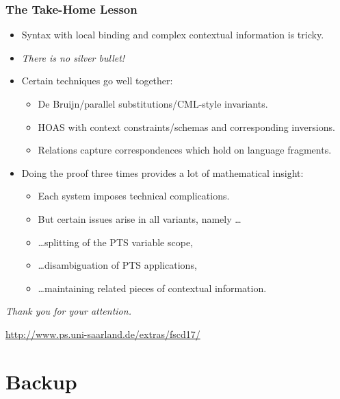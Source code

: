 \documentclass[english,pdftex,dvipsnames,leqno,handout]{beamer}%
\newcommand{\hl}[1]{\emph{\color{sbmcyan} #1}}
\begin{document}
\begin{frame}
  \frametitle{The Take-Home Lesson}
  \begin{itemize}
  \item Syntax with local binding and complex contextual information is tricky.
  \item \hl{There is no silver bullet!}
  \item Certain techniques go well together:
    \begin{itemize}
    \item De Bruijn/parallel substitutions/CML-style invariants.
    \item HOAS with context constraints/schemas and corresponding inversions.
    \item Relations capture correspondences which hold on language fragments.
    \end{itemize}
  \item Doing the proof three times provides a lot of mathematical insight:
    \begin{itemize}
    \item Each system imposes technical complications.
    \item But certain issues arise in all variants, namely \ldots
    \item \ldots splitting of the PTS variable scope,
    \item \ldots disambiguation of PTS applications,
    \item \ldots maintaining related pieces of contextual information.
    \end{itemize}
  \end{itemize}
\end{frame}

\begin{frame}
  \begin{center}
    \begin{Large}
      \hl{Thank you for your attention.}
    \end{Large}
    \vfill
    \url{http://www.ps.uni-saarland.de/extras/fscd17/}
  \end{center}
\end{frame}


\section*{Backup}
\end{document}
